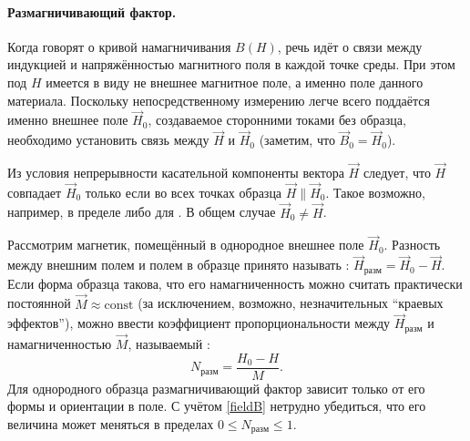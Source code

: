 %


\label{sec:measure-HB}

\paragraph{Размагничивающий фактор.}
Когда говорят о кривой намагничивания $B(H)$,
речь идёт о  связи между
индукцией и напряжённостью магнитного поля в каждой точке среды.
При этом под $H$ имеется в виду не внешнее магнитное поле,
а именно поле  данного материала. Поскольку непосредственному
измерению легче всего поддаётся именно внешнее поле $\vec{H}_{0}$,
создаваемое сторонними токами без образца, необходимо установить связь
между $\vec{H}$ и $\vec{H}_0$ (заметим, что $\vec{B}_0=\vec{H}_0$).

Из условия непрерывности касательной компоненты вектора $\vec{H}$ следует,
что $\vec{H}$ совпадает $\vec{H}_{0}$ только если во всех точках образца
$\vec{H} \parallel \vec{H}_{0}$.
Такое возможно, например, в пределе  либо
для .
В общем случае $\vec{H}_0 \ne \vec{H}$.

Рассмотрим магнетик, помещённый в однородное внешнее поле $\vec{H}_0$.
Разность между внешним полем и полем в образце принято называть
:
$\vec{H}_{разм} = \vec{H}_0 - \vec{H}$.
Если форма образца такова, что его намагниченность можно считать
практически постоянной $\vec{M}\approx\mathrm{const}$ (за исключением,
возможно, незначительных ``краевых эффектов''), можно ввести
коэффициент пропорциональности между $\vec{H}_{разм}$ и намагниченностью $\vec{M}$,
называемый :
\begin{equation*}
N_{разм} = \frac{H_0-H}{M}.
\end{equation*}
Для однородного образца размагничивающий фактор зависит
только от его формы и ориентации в поле.
С учётом \eqref{fieldB} нетрудно убедиться, что его величина может меняться в пределах $0\le N_{разм} \le 1$.

